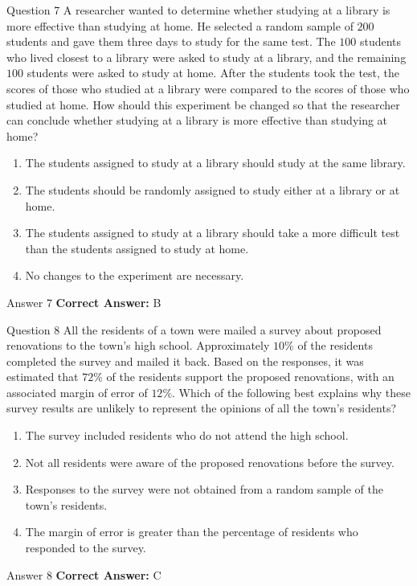 \documentclass{beamer}
\begin{document}
\begin{frame}{Question 7}
\small
A researcher wanted to determine whether studying at a library is more effective
than studying at home. He selected a random sample of \(200\) students and gave
them three days to study for the same test. The \(100\) students who lived closest
to a library were asked to study at a library, and the remaining \(100\) students
were asked to study at home. After the students took the test, the scores of those
who studied at a library were compared to the scores of those who studied at
home. How should this experiment be changed so that the researcher can conclude
whether studying at a library is more effective than studying at home?
\vspace{0.35cm}
\begin{enumerate}
    \item[A.] The students assigned to study at a library should study at the same library.
    \item[B.] The students should be randomly assigned to study either at a library or at home.
    \item[C.] The students assigned to study at a library should take a more difficult test than the students assigned to study at home.
    \item[D.] No changes to the experiment are necessary.
\end{enumerate}
\end{frame}
\begin{frame}{Answer 7}
\small
\textbf{Correct Answer:} B
\end{frame}

\begin{frame}{Question 8}
\small
All the residents of a town were mailed a survey about proposed renovations to
the town's high school. Approximately \(10\%\) of the residents completed the
survey and mailed it back. Based on the responses, it was estimated that \(72\%\)
of the residents support the proposed renovations, with an associated margin of
error of \(12\%\). Which of the following best explains why these survey results
are unlikely to represent the opinions of all the town's residents?
\vspace{0.35cm}
\begin{enumerate}
    \item[A.] The survey included residents who do not attend the high school.
    \item[B.] Not all residents were aware of the proposed renovations before the survey.
    \item[C.] Responses to the survey were not obtained from a random sample of the town's residents.
    \item[D.] The margin of error is greater than the percentage of residents who responded to the survey.
\end{enumerate}
\end{frame}
\begin{frame}{Answer 8}
\small
\textbf{Correct Answer:} C
\end{frame}
\end{document}
